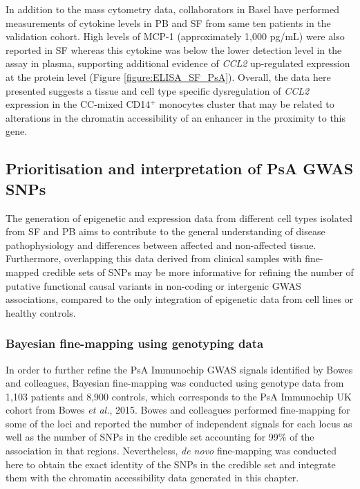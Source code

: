 In addition to the mass cytometry data, collaborators in Basel have performed measurements of cytokine levels in PB and SF from same ten patients in the validation cohort. High levels of MCP-1 (approximately 1,000 pg/mL) were also reported in SF whereas this cytokine was below the lower detection level in the assay in plasma, supporting additional evidence of \textit{CCL2} up-regulated expression at the protein level (Figure \ref{figure:ELISA_SF_PsA}). Overall, the data here presented suggests a tissue and cell type specific dysregulation of \textit{CCL2} expression in the CC-mixed CD14$^+$ monocytes cluster that may be related to alterations in the chromatin accessibility of an enhancer in the proximity to this gene.



\subsection{Prioritisation and interpretation of PsA GWAS SNPs}

The generation of epigenetic and expression data from different cell types isolated from SF and PB aims to contribute to the general understanding of disease pathophysiology and differences between affected and non-affected tissue. Furthermore, overlapping this data derived from clinical samples with fine-mapped credible sets of SNPs may be more informative for refining the number of putative functional causal variants in non-coding or intergenic GWAS associations, compared to the only integration of epigenetic data from cell lines or healthy controls.


\subsubsection{Bayesian fine-mapping using genotyping data}

In order to further refine the PsA Immunochip GWAS signals identified by Bowes and colleagues, Bayesian fine-mapping was conducted using genotype data from 1,103 patients and 8,900 controls, which corresponds to the PsA Immunochip UK cohort from Bowes \textit{et al.}, 2015. Bowes and colleagues performed fine-mapping for some of the loci and reported the number of independent signals for each locus as well as the number of SNPs in the credible set \parencite{Bowes2015} accounting for 99\% of the association in that regions. Nevertheless, \textit{de novo} fine-mapping was conducted here to obtain the exact identity of the SNPs in the credible set and integrate them with the chromatin accessibility data generated in this chapter. 

